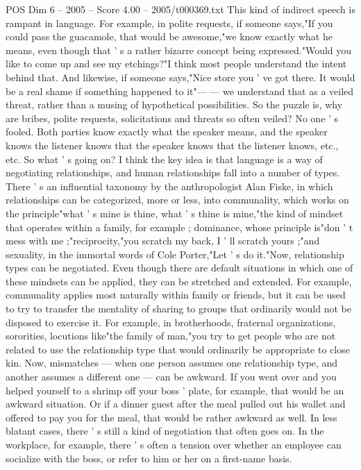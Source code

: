 \begin{textsample}{POS Dim 6 – 2005 – Score 4.00 – 2005/t000369.txt}
This kind of indirect speech is rampant in language.
For example, in polite requests, if someone says,"If you could pass the guacamole, that would be awesome,"we know exactly what he means, even though that ' s a rather bizarre concept being expressed."Would you like to come up and see my etchings?"I think most people understand the intent behind that.
And likewise, if someone says,"Nice store you ' ve got there.
It would be a real shame if something happened to it"— — we understand that as a veiled threat, rather than a musing of hypothetical possibilities.
So the puzzle is, why are bribes, polite requests, solicitations and threats so often veiled?
No one ' s fooled.
Both parties know exactly what the speaker means, and the speaker knows the listener knows that the speaker knows that the listener knows, etc., etc.
So what ' s going on?
I think the key idea is that language is a way of negotiating relationships, and human relationships fall into a number of types.
There ' s an influential taxonomy by the anthropologist Alan Fiske, in which relationships can be categorized, more or less, into communality, which works on the principle"what ' s mine is thine, what ' s thine is mine,"the kind of mindset that operates within a family, for example ; dominance, whose principle is"don ' t mess with me ;"reciprocity,"you scratch my back, I ' ll scratch yours ;"and sexuality, in the immortal words of Cole Porter,"Let ' s do it."Now, relationship types can be negotiated.
Even though there are default situations in which one of these mindsets can be applied, they can be stretched and extended.
For example, communality applies most naturally within family or friends, but it can be used to try to transfer the mentality of sharing to groups that ordinarily would not be disposed to exercise it.
For example, in brotherhoods, fraternal organizations, sororities, locutions like"the family of man,"you try to get people who are not related to use the relationship type that would ordinarily be appropriate to close kin.
Now, mismatches — when one person assumes one relationship type, and another assumes a different one — can be awkward.
If you went over and you helped yourself to a shrimp off your boss ' plate, for example, that would be an awkward situation.
Or if a dinner guest after the meal pulled out his wallet and offered to pay you for the meal, that would be rather awkward as well.
In less blatant cases, there ' s still a kind of negotiation that often goes on.
In the workplace, for example, there ' s often a tension over whether an employee can socialize with the boss, or refer to him or her on a first-name basis.

\end{textsample}
